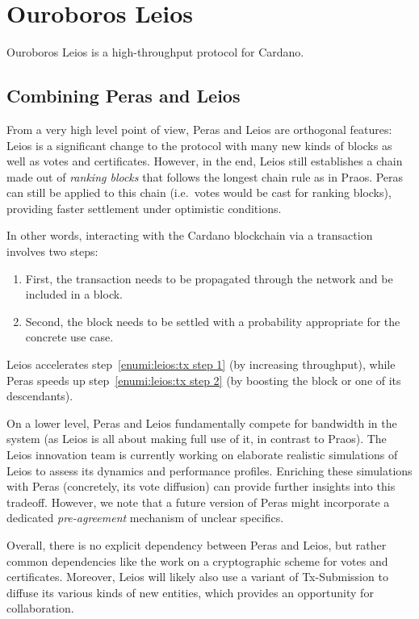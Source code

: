 \section{Ouroboros Leios}

Ouroboros Leios is a high-throughput protocol for Cardano.

\subsection{Combining Peras and Leios}

From a very high level point of view, Peras and Leios are orthogonal features:
Leios is a significant change to the protocol with many new kinds of blocks as well as votes and certificates.
However, in the end, Leios still establishes a chain made out of \emph{ranking blocks} that follows the longest chain rule as in Praos.
Peras can still be applied to this chain (i.e.\ votes would be cast for ranking blocks), providing faster settlement under optimistic conditions.

In other words, interacting with the Cardano blockchain via a transaction involves two steps:
\begin{enumerate}
\item\label{enumi:leios:tx step 1}
  First, the transaction needs to be propagated through the network and be included in a block.
\item\label{enumi:leios:tx step 2}
  Second, the block needs to be settled with a probability appropriate for the concrete use case.
\end{enumerate}
Leios accelerates step~\ref{enumi:leios:tx step 1} (by increasing throughput), while Peras speeds up step~\ref{enumi:leios:tx step 2} (by boosting the block or one of its descendants).

On a lower level, Peras and Leios fundamentally compete for bandwidth in the system (as Leios is all about making full use of it, in contrast to Praos).
The Leios innovation team is currently working on elaborate realistic simulations of Leios to assess its dynamics and performance profiles.
Enriching these simulations with Peras (concretely, its vote diffusion) can provide further insights into this tradeoff.
However, we note that a future version of Peras might incorporate a dedicated \emph{pre-agreement} mechanism of unclear specifics.

Overall, there is no explicit dependency between Peras and Leios, but rather common dependencies like the work on a cryptographic scheme for votes and certificates.
Moreover, Leios will likely also use a variant of Tx-Submission to diffuse its various kinds of new entities, which provides an opportunity for collaboration.

